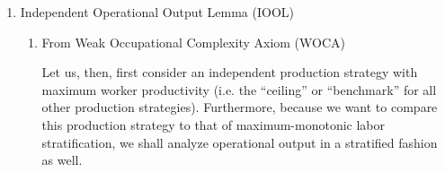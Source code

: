 \documentclass[hidelinks, nonatbib]{elsarticle}
\begin{document}
\begin{enumerate}

\item Independent Operational Output Lemma (IOOL)
\begin{enumerate}
    \item From Weak Occupational Complexity Axiom (WOCA)
    
    Let us, then, first consider an independent production strategy with maximum worker productivity (i.e. the ``ceiling'' or ``benchmark'' for all other production strategies). Furthermore, because we want to compare this production strategy to that of maximum-monotonic labor stratification, we shall analyze operational output in a stratified fashion as well.


\end{enumerate}
\end{enumerate}
\end{document}

